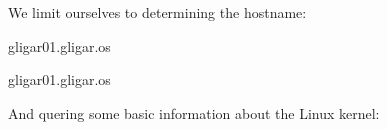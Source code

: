 We limit ourselves to determining the hostname:

\begin{prompt}
  gligar01.gligar.os

  gligar01.gligar.os
\end{prompt}

And quering some basic information about the Linux kernel:

